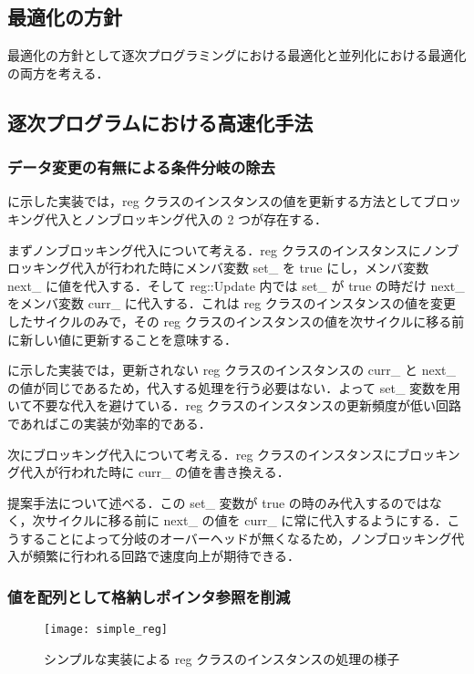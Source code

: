 \subsection{最適化の方針}

最適化の方針として逐次プログラミングにおける最適化と並列化における最適化の両方を考える．

\subsection{逐次プログラムにおける高速化手法}

\subsubsection{データ変更の有無による条件分岐の除去 \label{sss:no_set}}

 に示した実装では，reg
クラスのインスタンスの値を更新する方法としてブロッキング代入とノンブロッキング代入の
2 つが存在する．

まずノンブロッキング代入について考える．reg
クラスのインスタンスにノンブロッキング代入が行われた時にメンバ変数 set\_
を true にし，メンバ変数 next\_ に値を代入する．そして reg::Update
内では set\_ が true の時だけ next\_ をメンバ変数 curr\_
に代入する．これは reg
クラスのインスタンスの値を変更したサイクルのみで，その reg
クラスのインスタンスの値を次サイクルに移る前に新しい値に更新することを意味する．

 に示した実装では，更新されない reg
クラスのインスタンスの curr\_ と next\_
の値が同じであるため，代入する処理を行う必要はない．よって set\_
変数を用いて不要な代入を避けている．reg
クラスのインスタンスの更新頻度が低い回路であればこの実装が効率的である．

次にブロッキング代入について考える．reg クラスのインスタンスにブロッキング代入が行われた時に curr\_ の値を書き換える．

提案手法について述べる．この set\_ 変数が true
の時のみ代入するのではなく，次サイクルに移る前に next\_ の値を curr\_
に常に代入するようにする．こうすることによって分岐のオーバーヘッドが無くなるため，ノンブロッキング代入が頻繁に行われる回路で速度向上が期待できる．

\subsubsection{値を配列として格納しポインタ参照を削減} \label{sss:mem_copy}

\begin{figure}[t]
 \centering
 \texttt{[image: simple\_reg]}
 \caption{シンプルな実装による reg クラスのインスタンスの処理の様子}
 \label{fig:regs}
\end{figure}

